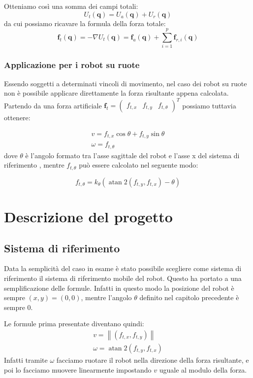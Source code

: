 \documentclass[Lau, binding=0.6cm, oneside]{sapthesis}
\begin{document}
Otteniamo così una somma dei campi totali:
$$
U_{t}(\boldsymbol{q})=U_{a}(\boldsymbol{q})+U_{r}(\boldsymbol{q})
$$
da cui possiamo ricavare la formula della forza totale:
$$
\boldsymbol{f}_{t}(\boldsymbol{q})=-\nabla U_{t}(\boldsymbol{q})=\boldsymbol{f}_{a}(\boldsymbol{q})+\sum_{i=1}^{p} \boldsymbol{f}_{r, i}(\boldsymbol{q})
$$
\cite{fonte2}

\subsection{Applicazione per i robot su ruote}
Essendo soggetti a determinati vincoli di movimento, nel caso dei robot su ruote non è possibile applicare direttamente la forza risultante appena calcolata.
Partendo da una forza artificiale $\boldsymbol{f}_{t}=\left(\begin{array}{lll}f_{t, x} & f_{t, y} & f_{t, \theta}\end{array}\right)^{T}$ possiamo tuttavia ottenere:

$$
\begin{array}{l}
v=f_{t, x} \cos \theta+f_{t, y} \sin \theta \\
\omega=f_{t, \theta}
\end{array}
$$
dove $\theta$ è l'angolo formato tra l'asse sagittale del robot e l'asse x del sistema di riferimento \cite{fonte4}, mentre $f_{t, \theta}$ può essere calcolato nel seguente modo\cite{fonte2}:

$$
f_{t, \theta}=k_{\theta}\left(\operatorname{atan} 2\left(f_{t, y}, f_{t, x}\right)-\theta\right)
$$

\chapter{Descrizione del progetto}
\section{Sistema di riferimento}
Data la semplicità del caso in esame è stato possibile scegliere come sistema di riferimento il sistema di riferimento mobile del robot.
Questo ha portato a una semplificazione delle formule.
Infatti in questo modo la posizione del robot è sempre $\left(x, y\right)=(0,0)$, mentre l'angolo $\theta$ definito nel capitolo precedente è sempre 0.

Le formule prima presentate diventano quindi:
$$
\begin{array}{l}
v=\left\|\left(f_{t, x}, f_{t, y}\right)\right\| \\
\omega=\operatorname{atan} 2\left(f_{t, y}, f_{t, x}\right)
\end{array}
$$
Infatti tramite $\omega$ facciamo ruotare il robot nella direzione della forza risultante, e poi lo facciamo muovere linearmente impostando $v$ uguale al modulo della forza.
\end{document}
